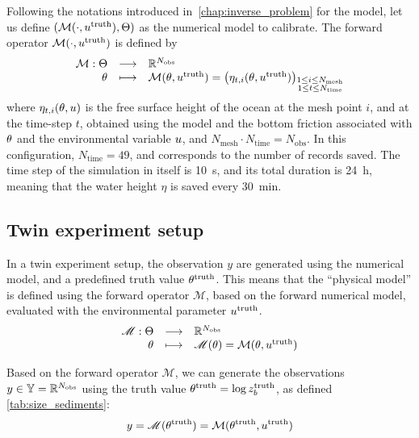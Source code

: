 \documentclass[../../Main_ManuscritThese.tex]{subfiles}
\newcommand{\zob}{z_b}
\begin{document}
Following the notations introduced in~\cref{chap:inverse_problem} for
the model, let us define
$(\mathcal{M}(\cdot,u^{\mathrm{truth}}),\Theta)$ as the numerical
model to calibrate. The forward operator $\mathcal{M}(\cdot, u^{\mathrm{truth}})$ is
defined by
\begin{equation}
  \begin{array}{rcl}
    \mathcal{M}: \Theta  &\longrightarrow& \mathbb{R}^{N_{\mathrm{obs}}} \\
    \theta & \longmapsto & \mathcal{M}(\theta, u^{\mathrm{truth}}) = \left(\eta_{t,i}(\theta, u^{\mathrm{truth}})\right)_{\substack{1 \leq i \leq N_{\mathrm{mesh}} \\ 1 \leq t \leq N_{\mathrm{time}}}} \\ 
  \end{array}
\end{equation}
where $\eta_{t,i}(\theta,u)$ is the free surface height of the ocean at
the mesh point $i$, and at the time-step $t$, obtained using the model
and the bottom friction associated with $\theta$ and the environmental
variable $u$, and
$N_{\mathrm{mesh}} \cdot N_{\mathrm{time}} = N_{\mathrm{obs}}$.  In
this configuration, $N_{\mathrm{time}} =\num{49}$, and corresponds to
the number of records saved. The time step of the simulation in itself
is \SI{10}{\second}, and its total duration is \SI{24}{\hour}, meaning that the
water height $\eta$ is saved every \SI{30}{\minute}.

\subsection{Twin experiment setup}
In a twin experiment setup, the observation $y$ are generated using
the numerical model, and a predefined truth value
$\theta^{\mathrm{truth}}$.  This means that the ``physical model'' is
defined using the forward operator $\mathscr{M}$, based on the forward
numerical model, evaluated with the environmental parameter
$u^{\mathrm{truth}}$.
\begin{equation}
  \label{eq:twin_exp}
  \begin{array}{rcl}
    \mathscr{M}: \Theta &\longrightarrow & \mathbb{R}^{N_{\mathrm{obs}}} \\
    \theta & \longmapsto &\mathscr{M}(\theta) = \mathcal{M}(\theta, u^{\mathrm{truth}})
  \end{array}
\end{equation}

Based on the forward operator $\mathscr{M}$, we can generate the
observations $y\in \mathbb{Y} = \mathbb{R}^{N_{\mathrm{obs}}}$ using the
truth value $\kk^{\mathrm{truth}}=\log \zob^{\mathrm{truth}}$, as
defined \cref{tab:size_sediments}:
\begin{equation}
  y = \mathscr{M}(\theta^{\mathrm{truth}}) = \mathcal{M}(\theta^{\mathrm{truth}}, u^{\mathrm{truth}})
\end{equation}
\end{document}
